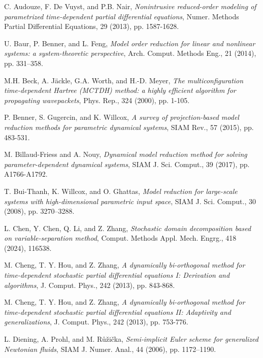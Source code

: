 \documentclass[10pt,a4paper]{article}
\numberwithin{equation}{section}
\numberwithin{lemma}{section}
\numberwithin{example}{section}
\numberwithin{definition}{section}
\numberwithin{assumption}{section}
\numberwithin{theorem}{section}
\numberwithin{proposition}{section}
\numberwithin{corollary}{section}
\numberwithin{remark}{section}
\begin{document}
\begin{thebibliography}{}

    {\sc C. Audouze, F. De Vuyst, and P.B. Nair}, {\em Nonintrusive reduced-order modeling of parametrized time-dependent partial differential equations}, Numer. Methods Partial Differential Equations, 29 (2013), pp. 1587-1628.
    
    
    {\sc U. Baur, P. Benner, and L. Feng}, {\em Model order reduction for linear and nonlinear systems: a system-theoretic perspective}, Arch. Comput. Methods Eng., 21 (2014), pp. 331–358. 


    {\sc M.H. Beck, A. J{\"a}ckle, G.A. Worth, and H.-D. Meyer}, {\em The multiconfiguration time-dependent Hartree (MCTDH) method: a highly efficient algorithm for propagating wavepackets}, Phys. Rep., 324 (2000), pp. 1-105.
    
    {\sc P. Benner, S. Gugercin, and K. Willcox}, {\em A survey of projection-based model reduction methods for parametric dynamical systems}, SIAM Rev., 57 (2015), pp. 483-531. 

    {\sc M. Billaud-Friess and A. Nouy}, {\em Dynamical model reduction method for solving parameter-dependent dynamical systems}, SIAM J. Sci. Comput., 39 (2017), pp. A1766-A1792.
    
  
    {\sc T. Bui-Thanh, K. Willcox, and O. Ghattas}, {\em Model reduction for large-scale systems with high-dimensional parametric input space}, SIAM J. Sci. Comput., 30 (2008), pp. 3270–3288.

    
    {\sc L. Chen, Y. Chen, Q. Li, and Z. Zhang}, {\em Stochastic domain decomposition based on variable-separation method}, Comput. Methods Appl. Mech. Engrg., 418 (2024), 116538.
    
    
    {\sc M. Cheng, T. Y. Hou, and Z. Zhang}, {\em A dynamically bi-orthogonal method for time-dependent stochastic partial differential equations I: Derivation and algorithms}, J. Comput. Phys., 242 (2013), pp. 843-868.
    
    {\sc M. Cheng, T. Y. Hou, and Z. Zhang}, {\em A dynamically bi-orthogonal method for time-dependent stochastic partial differential equations II: Adaptivity and generalizations}, J. Comput. Phys., 242 (2013), pp. 753-776.

    {\sc L. Diening, A. Prohl, and M. Růžička}, {\em Semi‐implicit Euler scheme for generalized Newtonian fluids}, SIAM J. Numer. Anal., 44 (2006), pp. 1172–1190.


\end{thebibliography}
\end{document}
